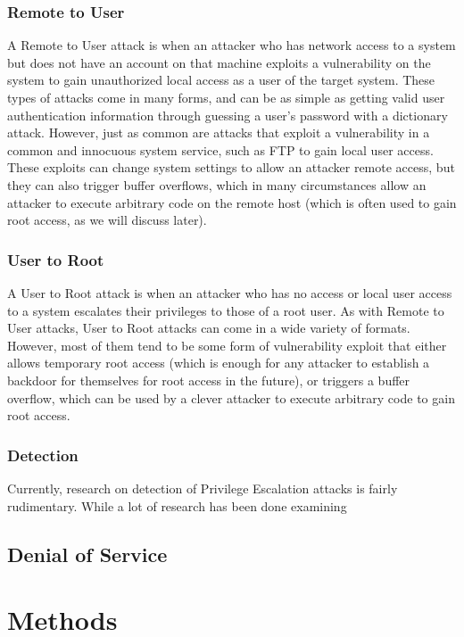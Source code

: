 \documentclass{acm_proc_article-sp}
\begin{document}
    \subsubsection{Remote to User}
    A Remote to User attack is when an attacker who has network access to a system but does not have an account on that machine exploits a vulnerability on the system to gain unauthorized local access as a user of the target system. These types of attacks come in many forms, and can be as simple as getting valid user authentication information through guessing a user's password with a dictionary attack. However, just as common are attacks that exploit a vulnerability in a common and innocuous system service, such as FTP to gain local user access. These exploits can change system settings to allow an attacker remote access, but they can also trigger buffer overflows, which in many circumstances allow an attacker to execute arbitrary code on the remote host (which is often used to gain root access, as we will discuss later). 
    \subsubsection{User to Root}
     A User to Root attack is when an attacker who has no access or local user access to a system escalates their privileges to those of a root user. As with Remote to User attacks, User to Root attacks can come in a wide variety of formats. However, most of them tend to be some form of vulnerability exploit that either allows temporary root access (which is enough for any attacker to establish a backdoor for themselves for root access in the future), or triggers a buffer overflow, which can be used by a clever attacker to execute arbitrary code to gain root access. 
     \subsubsection{Detection}
     Currently, research on detection of Privilege Escalation attacks is fairly rudimentary. While a lot of research has been done examining  
    \subsection{Denial of Service}

\section{Methods}
\end{document}
